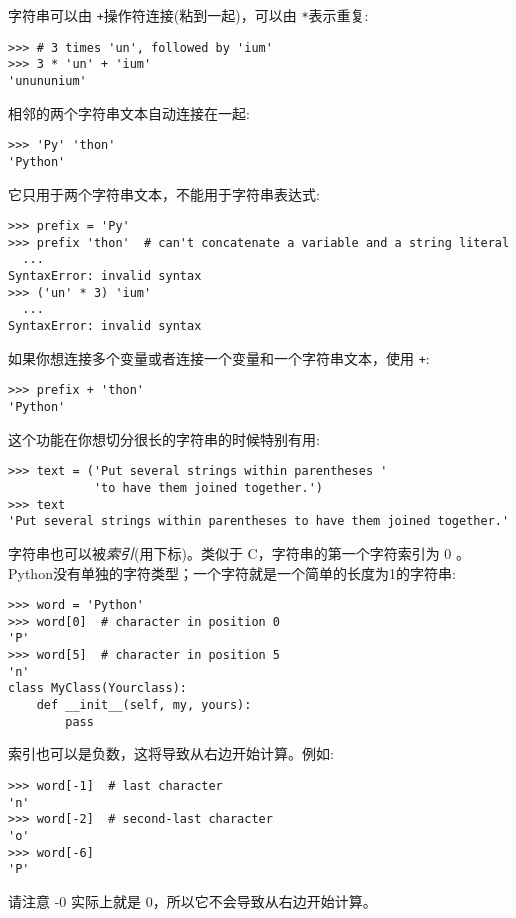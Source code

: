 字符串可以由 \verb|+|操作符连接(粘到一起)，可以由 \verb|*|表示重复:
\begin{lstlisting}
>>> # 3 times 'un', followed by 'ium'
>>> 3 * 'un' + 'ium'
'unununium'
\end{lstlisting}

相邻的两个字符串文本自动连接在一起:
\begin{lstlisting}
>>> 'Py' 'thon'
'Python'
\end{lstlisting}
它只用于两个字符串文本，不能用于字符串表达式:
\begin{lstlisting}
>>> prefix = 'Py'
>>> prefix 'thon'  # can't concatenate a variable and a string literal
  ...
SyntaxError: invalid syntax
>>> ('un' * 3) 'ium'
  ...
SyntaxError: invalid syntax
\end{lstlisting}

如果你想连接多个变量或者连接一个变量和一个字符串文本，使用 \verb|+|:
\begin{lstlisting}
>>> prefix + 'thon'
'Python'
\end{lstlisting}
这个功能在你想切分很长的字符串的时候特别有用:
\begin{lstlisting}
>>> text = ('Put several strings within parentheses '
            'to have them joined together.')
>>> text
'Put several strings within parentheses to have them joined together.'
\end{lstlisting}

字符串也可以被\emph{索引}(用下标)。类似于 C，字符串的第一个字符索引为 0 。Python没有单独的字符类型；一个字符就是一个简单的长度为1的字符串:
\begin{lstlisting}
>>> word = 'Python'
>>> word[0]  # character in position 0
'P'
>>> word[5]  # character in position 5
'n'
class MyClass(Yourclass):
    def __init__(self, my, yours):
        pass
\end{lstlisting}

索引也可以是负数，这将导致从右边开始计算。例如:
\begin{lstlisting}
>>> word[-1]  # last character
'n'
>>> word[-2]  # second-last character
'o'
>>> word[-6]
'P'
\end{lstlisting}
请注意 -0 实际上就是 0，所以它不会导致从右边开始计算。

